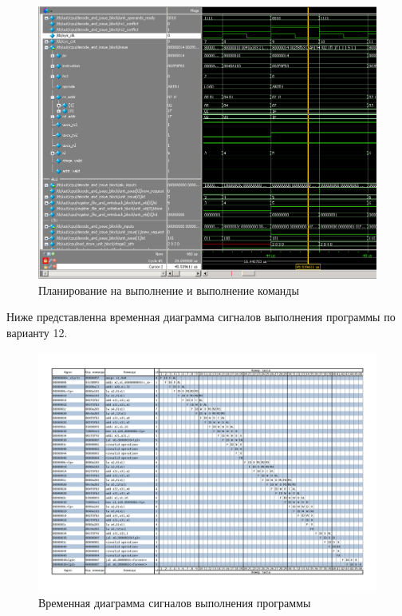 \begin{figure}[h!]
	\begin{center}
		\includegraphics[scale=0.6]{assets/80000014.2.png}
	\end{center}
	\caption{Планирование на выполнение и выполнение команды}
\end{figure}

Ниже представленна временная диаграмма сигналов выполнения программы по варианту 12.
\newpage

\begin{figure}[h!]
	\begin{center}
		\includegraphics[scale=0.4]{assets/pipeline.png}
	\end{center}
	\caption{Временная диаграмма сигналов выполнения программы}
\end{figure}

